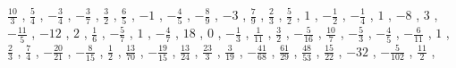 \documentclass[12pt,fleqn]{article}
\theoremstyle{aufg}
\theoremstyle{bsp}
\begin{document}
\begin{flushleft}
$ \scriptstyle\frac{10}{3}$ , $ \scriptstyle\frac{5}{4}$ , $ \scriptstyle- \frac{3}{4}$ , $ \scriptstyle- \frac{3}{7}$ , $ \scriptstyle\frac{3}{2}$ , $ \scriptstyle\frac{6}{5}$ , $ \scriptstyle-1$ , $ \scriptstyle- \frac{4}{5}$ , $ \scriptstyle- \frac{8}{9}$ , $ \scriptstyle-3$ , $ \scriptstyle\frac{7}{9}$ , $ \scriptstyle\frac{2}{3}$ , $ \scriptstyle\frac{5}{2}$ , $ \scriptstyle1$ , $ \scriptstyle- \frac{1}{2}$ , $ \scriptstyle- \frac{1}{4}$ , $ \scriptstyle1$ , $ \scriptstyle-8$ , $ \scriptstyle3$ , $ \scriptstyle- \frac{11}{5}$ , $ \scriptstyle-12$ , $ \scriptstyle2$ , $ \scriptstyle\frac{1}{6}$ , $ \scriptstyle- \frac{5}{7}$ , $ \scriptstyle1$ , $ \scriptstyle- \frac{4}{7}$ , $ \scriptstyle18$ , $ \scriptstyle0$ , $ \scriptstyle- \frac{1}{3}$ , $ \scriptstyle\frac{1}{11}$ , $ \scriptstyle\frac{3}{2}$ , $ \scriptstyle- \frac{5}{16}$ , $ \scriptstyle\frac{10}{7}$ , $ \scriptstyle- \frac{5}{3}$ , $ \scriptstyle- \frac{4}{5}$ , $ \scriptstyle- \frac{6}{11}$ , $ \scriptstyle1$ , $ \scriptstyle\frac{2}{3}$ , $ \scriptstyle\frac{7}{4}$ , $ \scriptstyle- \frac{20}{21}$ , $ \scriptstyle- \frac{8}{15}$ , $ \scriptstyle\frac{1}{2}$ , $ \scriptstyle\frac{13}{70}$ , $ \scriptstyle- \frac{19}{15}$ , $ \scriptstyle\frac{13}{24}$ , $ \scriptstyle\frac{23}{3}$ , $ \scriptstyle\frac{3}{19}$ , $ \scriptstyle- \frac{41}{68}$ , $ \scriptstyle\frac{61}{29}$ , $ \scriptstyle\frac{48}{53}$ , $ \scriptstyle\frac{15}{22}$ , $ \scriptstyle-32$ , $ \scriptstyle- \frac{5}{102}$ , $ \scriptstyle\frac{11}{2}$ , \end{flushleft} 
\end{document}
